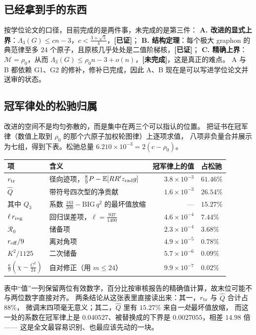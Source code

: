 \documentclass[UTF8,11pt]{ctexart}
\newcommand{\Lam}{\Lambda}
\newcommand{\E}{\mathbb{E}}
\newcommand{\M}{\mathcal{M}}
\newcommand{\ok}{\textcolor[rgb]{0.05,0.45,0.15}{\bfseries [已证]}}
\newcommand{\todo}{\textcolor[rgb]{0.70,0.15,0.10}{\bfseries [未完成]}}
\begin{document}
\subsection{已经拿到手的东西}

按学位论文的口径，目前完成的是两件事，未完成的是第三件：
\textbf{A. 改进的显式上界}：$\Lam_3(G)\le cn-3$，$c<\frac{3+\sqrt5}{4}$，\ok；
\textbf{B. 结构定理}：每个极大 graphon 的典范律至多 $24$ 个原子，且原核几乎处处是二值阶梯核，\ok；
\textbf{C. 精确上界}：$\M=\rho_0$，从而 $\Lam_3(G)\le\rho_0n-3+o(n)$，\todo，这是真正的难点。
A 与 B 都依赖 G1、G2 的修补，修补已完成，因此 A、B 现在是可以写进学位论文并送审的状态。

\subsection{冠军律处的松驰归属}

改进的空间不是均匀弥散的，而是集中在两三个可以指认的位置。
把证书在冠军律（数值上取到 $\rho_0$ 的那个六原子加权轮图律）上逐项求值，
八项非负量合并展示为七组，得到下表。松驰总量 $6.210\times10^{-3}=2(c-\rho_0)$。

\begin{center}
\small
\begin{tabular}{llrl}
\toprule
项 & 含义 & 冠军律上的值 & 占松驰 \\
\midrule
$r_{\rm tr}$ & 径向迹项，$\frac89P-\E[RR'z_{\rm rad}g]$ & $3.8\times10^{-3}$ & $61.46\%$ \\
$\widehat Q$ & 带符号四次型的净贡献 & $1.6\times10^{-3}$ & $26.54\%$ \\
\quad 其中 $Q_3$ & 系数 $\frac{183}{200}-\mathrm{BIG}\,q^2$ 的最坏值放缩 & --- & $15.27\%$ \\
$\ell\, r_{\rm reg}$ & 回归误差项，$\ell=\frac{937}{1400}$ & $4.6\times10^{-4}$ & $7.44\%$ \\
$\mathcal R_0$ & 储备项 & $2.3\times10^{-4}$ & $3.68\%$ \\
$r_{\rm off}/9$ & 离对角项 & $4.9\times10^{-5}$ & $0.78\%$ \\
$K^2/1125$ & 二次储备 & $5.7\times10^{-6}$ & $0.09\%$ \\
$\frac\kappa9(\chi-\frac{C^2}{24})$ & 自对修正（用 $m\le24$） & $9.9\times10^{-7}$ & $0.02\%$ \\
\bottomrule
\end{tabular}
\end{center}

\noindent 表中``值''一列保留两位有效数字，百分比按审核报告的精确值计算，故末位可能不与两位数字直接对齐。
两条结论从这张表里直接读出来：其一，$r_{\rm tr}$ 与 $\widehat Q$ 合计占 $88\%$，
微调末四项毫无意义；其二，$\widehat Q$ 里有 $15.27\%$ 来自\emph{一处}最坏值放缩，
而这一处的系数在冠军律上是 $0.040527$、被替换成的下界是 $0.0027055$，相差 $14.98$ 倍——
这是全文最容易识别、也最应该先动的一块。
\end{document}
